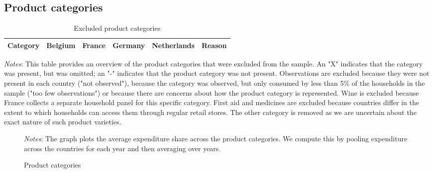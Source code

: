 \subsection{Product categories}
\begin{table}[H]
	\centering		
	\caption{Excluded product categories}
    \label{tab: app_data_prod_cat_excluded}
	\begin{spacing}{1.1}
        \begin{tabular}{lccccl} \toprule
            Category & Belgium & France & Germany & Netherlands & Reason \\ \midrule
		    
	    \end{tabular}
    \end{spacing}
    \parbox{\textwidth}{
        \begin{spacing}{1} 
            {\footnotesize 
            \textit{Notes}: This table provides an overview of the product categories that were excluded from the sample. An "X" indicates that the category was present, but was omitted; an "-" indicates that the product category was not present. Observations are excluded because they were not present in each country ("not observed"), because the category was observed, but only consumed by less than 5\% of the households in the sample ("too few observations") or because there are concerns about how the product category is represented. Wine is excluded because France collects a separate household panel for this specific category. First aid and medicines are excluded because countries differ in the extent to which households can access them through regular retail stores. The other category is removed as we are uncertain about the exact nature of such product varieties.}
        \end{spacing}}
\end{table}

\begin{figure}[H]
	\centering
	\caption{Product categories}
    \label{fig: app_data_prod_cat_overview}
        \scalebox{0.8}{
		}
	\parbox{\textwidth}{
	\begin{spacing}{1} 
		{\footnotesize} 
        \textit{Notes}: The graph plots the average expenditure share across the product categories. We compute this by pooling expenditure across the countries for each year and then averaging over years. 
	\end{spacing}}
\end{figure}

